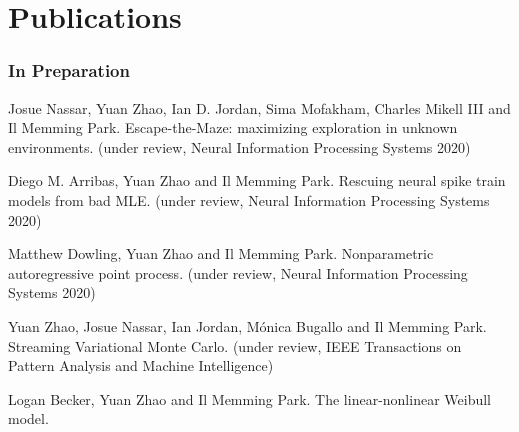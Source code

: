 \documentclass[12pt, letterpaper]{article}
\begin{document}
\section*{Publications}
\subsubsection*{In Preparation}
\begin{enumerate}[label={[\arabic*]}]
    \item Josue Nassar, Yuan Zhao, Ian D. Jordan, Sima Mofakham, Charles Mikell III and Il Memming Park. 
    Escape-the-Maze: maximizing exploration in unknown environments. (under review, Neural Information Processing Systems 2020)
    \item Diego M. Arribas, Yuan Zhao and Il Memming Park. 
    Rescuing neural spike train models from bad MLE. (under review, Neural Information Processing Systems 2020)
    \item Matthew Dowling, Yuan Zhao and Il Memming Park. 
    Nonparametric autoregressive point process. (under review, Neural Information Processing Systems 2020)
    \item Yuan Zhao, Josue Nassar, Ian Jordan, M\'onica Bugallo and Il Memming Park. 
    Streaming Variational Monte Carlo. (under review, IEEE Transactions on Pattern Analysis and Machine Intelligence)
    \item Logan Becker, Yuan Zhao and Il Memming Park. 
    The linear-nonlinear Weibull model.
\end{enumerate}
\end{document}

